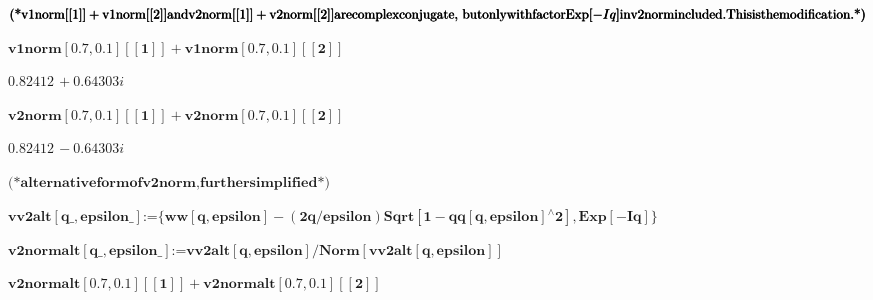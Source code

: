 {\begin{doublespace}
\noindent\(\pmb{\text{(*} \text{v1norm}[[1]]+\text{v1norm}[[2]] \text{and} \text{v2norm}[[1]]+\text{v2norm}[[2]] \text{are} \text{complex} \text{conjugate},
}\\
\pmb{\text{   }\text{but} \text{only} \text{with} \text{factor} \text{Exp}[-I q] \text{in} \text{v2norm} \text{included}. \text{This} \text{is} \text{the}
\text{modification}. \text{*)}}\)
\end{doublespace}

\begin{doublespace}
\noindent\(\pmb{\text{v1norm}[0.7,0.1][[1]]+\text{v1norm}[0.7,0.1][[2]]}\)
\end{doublespace}

\begin{doublespace}
\noindent\(0.82412\, +0.64303 i\)
\end{doublespace}

\begin{doublespace}
\noindent\(\pmb{\text{v2norm}[0.7,0.1][[1]]+\text{v2norm}[0.7,0.1][[2]]}\)
\end{doublespace}

\begin{doublespace}
\noindent\(0.82412\, -0.64303 i\)
\end{doublespace}

\begin{doublespace}
\noindent\(\pmb{\text{(*} \text{alternative} \text{form} \text{of} \text{v2norm}, \text{further} \text{simplified} \text{*)}}\)
\end{doublespace}

\begin{doublespace}
\noindent\(\pmb{\text{vv2alt}[\text{q$\_$},\text{epsilon$\_$}]\text{:=} \{\text{ww}[q,\text{epsilon}]-(2q/\text{epsilon})\text{Sqrt}[1-\text{qq}[q,\text{epsilon}]{}^{\wedge}2],\text{Exp}[-I
q]\}}\)
\end{doublespace}

\begin{doublespace}
\noindent\(\pmb{\text{v2normalt}[\text{q$\_$}, \text{epsilon$\_$}]\text{:=}\text{vv2alt}[q,\text{epsilon}]/\text{Norm}[\text{vv2alt}[q,\text{epsilon}]]}\)
\end{doublespace}

\begin{doublespace}
\noindent\(\pmb{\text{v2normalt}[0.7, 0.1][[1]]+\text{v2normalt}[0.7, 0.1][[2]]}\)
\end{doublespace}

}

